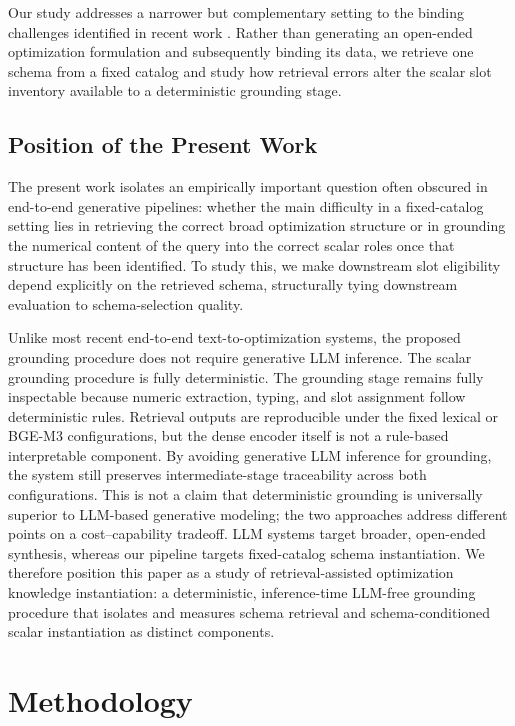 \documentclass[3p]{elsarticle}
\begin{document}
Our study addresses a narrower but complementary setting to the binding challenges identified in recent work \cite{gao2026models}. Rather than generating an open-ended optimization formulation and subsequently binding its data, we retrieve one schema from a fixed catalog and study how retrieval errors alter the scalar slot inventory available to a deterministic grounding stage. 

\subsection{Position of the Present Work}
\label{subsec:rw_position}

The present work isolates an empirically important question often obscured in end-to-end generative pipelines: whether the main difficulty in a fixed-catalog setting lies in retrieving the correct broad optimization structure or in grounding the numerical content of the query into the correct scalar roles once that structure has been identified. To study this, we make downstream slot eligibility depend explicitly on the retrieved schema, structurally tying downstream evaluation to schema-selection quality. 

Unlike most recent end-to-end text-to-optimization systems, the proposed grounding procedure does not require generative LLM inference. The scalar grounding procedure is fully deterministic. The grounding stage remains fully inspectable because numeric extraction, typing, and slot assignment follow deterministic rules. Retrieval outputs are reproducible under the fixed lexical or BGE-M3 configurations, but the dense encoder itself is not a rule-based interpretable component. By avoiding generative LLM inference for grounding, the system still preserves intermediate-stage traceability across both configurations. This is not a claim that deterministic grounding is universally superior to LLM-based generative modeling; the two approaches address different points on a cost--capability tradeoff. LLM systems target broader, open-ended synthesis, whereas our pipeline targets fixed-catalog schema instantiation. We therefore position this paper as a study of retrieval-assisted optimization knowledge instantiation: a deterministic, inference-time LLM-free grounding procedure that isolates and measures schema retrieval and schema-conditioned scalar instantiation as distinct components.

\section{Methodology}
\label{sec:method}
\end{document}
